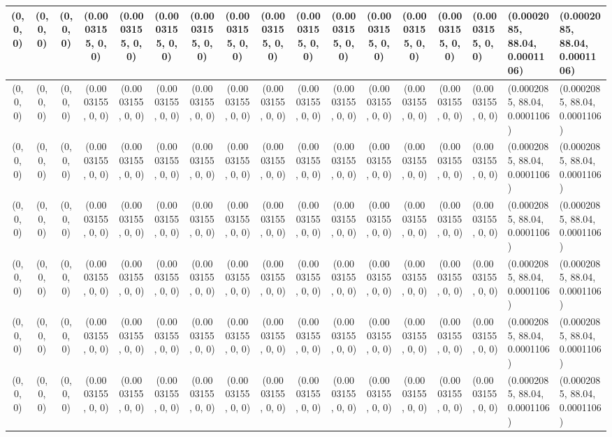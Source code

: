 \begin{tabular}{| c | c | c | c | c | c | c | c | c | c | c | c | c | c |}
	(0, 0, 0) & (0, 0, 0) & (0, 0, 0) & (0.0003155, 0, 0) & (0.0003155, 0, 0) & (0.0003155, 0, 0) & (0.0003155, 0, 0) & (0.0003155, 0, 0) & (0.0003155, 0, 0) & (0.0003155, 0, 0) & (0.0003155, 0, 0) & (0.0003155, 0, 0) & (0.0003155, 0, 0) & (0.0003155, 0, 0) & (0.0003155, 0, 0) & (0.0002085, 88.04, 0.0001106) & (0.0002085, 88.04, 0.0001106) \\ \hline
	(0, 0, 0) & (0, 0, 0) & (0, 0, 0) & (0.0003155, 0, 0) & (0.0003155, 0, 0) & (0.0003155, 0, 0) & (0.0003155, 0, 0) & (0.0003155, 0, 0) & (0.0003155, 0, 0) & (0.0003155, 0, 0) & (0.0003155, 0, 0) & (0.0003155, 0, 0) & (0.0003155, 0, 0) & (0.0003155, 0, 0) & (0.0003155, 0, 0) & (0.0002085, 88.04, 0.0001106) & (0.0002085, 88.04, 0.0001106) \\ \hline
	(0, 0, 0) & (0, 0, 0) & (0, 0, 0) & (0.0003155, 0, 0) & (0.0003155, 0, 0) & (0.0003155, 0, 0) & (0.0003155, 0, 0) & (0.0003155, 0, 0) & (0.0003155, 0, 0) & (0.0003155, 0, 0) & (0.0003155, 0, 0) & (0.0003155, 0, 0) & (0.0003155, 0, 0) & (0.0003155, 0, 0) & (0.0003155, 0, 0) & (0.0002085, 88.04, 0.0001106) & (0.0002085, 88.04, 0.0001106) \\ \hline
	(0, 0, 0) & (0, 0, 0) & (0, 0, 0) & (0.0003155, 0, 0) & (0.0003155, 0, 0) & (0.0003155, 0, 0) & (0.0003155, 0, 0) & (0.0003155, 0, 0) & (0.0003155, 0, 0) & (0.0003155, 0, 0) & (0.0003155, 0, 0) & (0.0003155, 0, 0) & (0.0003155, 0, 0) & (0.0003155, 0, 0) & (0.0003155, 0, 0) & (0.0002085, 88.04, 0.0001106) & (0.0002085, 88.04, 0.0001106) \\ \hline
	(0, 0, 0) & (0, 0, 0) & (0, 0, 0) & (0.0003155, 0, 0) & (0.0003155, 0, 0) & (0.0003155, 0, 0) & (0.0003155, 0, 0) & (0.0003155, 0, 0) & (0.0003155, 0, 0) & (0.0003155, 0, 0) & (0.0003155, 0, 0) & (0.0003155, 0, 0) & (0.0003155, 0, 0) & (0.0003155, 0, 0) & (0.0003155, 0, 0) & (0.0002085, 88.04, 0.0001106) & (0.0002085, 88.04, 0.0001106) \\ \hline
	(0, 0, 0) & (0, 0, 0) & (0, 0, 0) & (0.0003155, 0, 0) & (0.0003155, 0, 0) & (0.0003155, 0, 0) & (0.0003155, 0, 0) & (0.0003155, 0, 0) & (0.0003155, 0, 0) & (0.0003155, 0, 0) & (0.0003155, 0, 0) & (0.0003155, 0, 0) & (0.0003155, 0, 0) & (0.0003155, 0, 0) & (0.0003155, 0, 0) & (0.0002085, 88.04, 0.0001106) & (0.0002085, 88.04, 0.0001106) \\ \hline
	(0, 0, 0) & (0, 0, 0) & (0, 0, 0) & (0.0003155, 0, 0) & (0.0003155, 0, 0) & (0.0003155, 0, 0) & (0.0003155, 0, 0) & (0.0003155, 0, 0) & (0.0003155, 0, 0) & (0.0003155, 0, 0) & (0.0003155, 0, 0) & (0.0003155, 0, 0) & (0.0003155, 0, 0) & (0.0003155, 0, 0) & (0.0003155, 0, 0) & (0.0002085, 88.04, 0.0001106) & (0.0002085, 88.04, 0.0001106) \\ \hline

\end{tabular}
